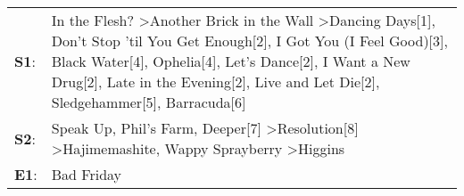 \begin{supertabular}{p{0.03\textwidth}p{0.92\textwidth}}
 \textbf{S1}:  &  In the Flesh?\textsuperscript{} \textgreater \enspace Another Brick in the Wall\textsuperscript{} \textgreater \enspace Dancing Days[1]\textsuperscript{}, \enspace Don't Stop 'til You Get Enough[2]\textsuperscript{}, \enspace I Got You (I Feel Good)[3]\textsuperscript{}, \enspace Black Water[4]\textsuperscript{}, \enspace Ophelia[4]\textsuperscript{}, \enspace Let's Dance[2]\textsuperscript{}, \enspace I Want a New Drug[2]\textsuperscript{}, \enspace Late in the Evening[2]\textsuperscript{}, \enspace Live and Let Die[2]\textsuperscript{}, \enspace Sledgehammer[5]\textsuperscript{}, \enspace Barracuda[6]\textsuperscript{}  \enspace  \\
 \textbf{S2}:  &                                                                                                                                                                                                                                                                                                                                     Speak Up\textsuperscript{}, \enspace Phil's Farm\textsuperscript{}, \enspace Deeper[7]\textsuperscript{} \textgreater \enspace Resolution[8]\textsuperscript{} \textgreater \enspace Hajimemashite\textsuperscript{}, \enspace Wappy Sprayberry\textsuperscript{} \textgreater \enspace Higgins\textsuperscript{}  \enspace  \\
 \textbf{E1}:  &                                                                                                                                                                                                                                                                                                                                                                                                                                                                                                                                                                                                                          Bad Friday\textsuperscript{}  \enspace  \\
\end{supertabular}
